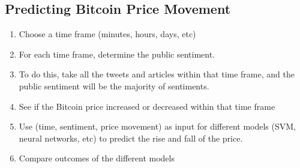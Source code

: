 \documentclass[12pt,a4paper]{report}
\begin{document}
\subsection*{Predicting Bitcoin Price Movement}

\begin{enumerate}
	\item Choose a time frame (minutes, hours, days, etc)
	\item For each time frame, determine the public sentiment.
	\item To do this, take all the tweets and articles within that time frame, and the public sentiment will be the majority of sentiments.
	\item See if the Bitcoin price increased or decreased within that time frame
	\item Use (time, sentiment, price movement) as input for different models (SVM, neural networks, etc) to predict the rise and fall of the price.
	\item Compare outcomes of the different models
\end{enumerate}
\end{document}
